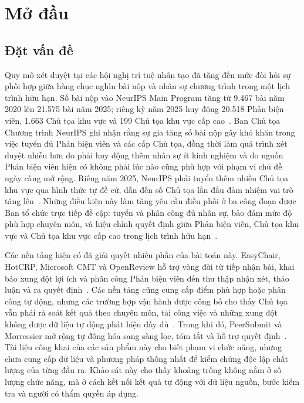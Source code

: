 \chapter{Mở đầu}
\label{Chapter1}

\section{Đặt vấn đề}

Quy mô xét duyệt tại các hội nghị trí tuệ nhân tạo đã tăng đến mức đòi hỏi sự phối hợp giữa hàng chục nghìn bài nộp và nhân sự chương trình trong một lịch trình hữu hạn. Số bài nộp vào NeurIPS Main Program tăng từ 9.467 bài năm 2020 lên 21.575 bài năm 2025; riêng kỳ năm 2025 huy động 20.518 Phản biện viên, 1.663 Chủ tọa khu vực và 199 Chủ tọa khu vực cấp cao~\cite{ch1ref17}. Ban Chủ tọa Chương trình NeurIPS ghi nhận rằng sự gia tăng số bài nộp gây khó khăn trong việc tuyển đủ Phản biện viên và các cấp Chủ tọa, đồng thời làm quá trình xét duyệt nhiễu hơn do phải huy động thêm nhân sự ít kinh nghiệm và do nguồn Phản biện viên hiện có không phải lúc nào cũng phù hợp với phạm vi chủ đề ngày càng mở rộng. Riêng năm 2025, NeurIPS phải tuyển thêm nhiều Chủ tọa khu vực qua hình thức tự đề cử, dẫn đến số Chủ tọa lần đầu đảm nhiệm vai trò tăng lên~\cite{ch1ref17}. Những điều kiện này làm tăng yêu cầu điều phối ở ba công đoạn được Ban tổ chức trực tiếp đề cập: tuyển và phân công đủ nhân sự, bảo đảm mức độ phù hợp chuyên môn, và hiệu chỉnh quyết định giữa Phản biện viên, Chủ tọa khu vực và Chủ tọa khu vực cấp cao trong lịch trình hữu hạn~\cite{ch1ref17}.

Các nền tảng hiện có đã giải quyết nhiều phần của bài toán này. EasyChair, HotCRP, Microsoft CMT và OpenReview hỗ trợ vòng đời từ tiếp nhận bài, khai báo xung đột lợi ích và phân công Phản biện viên đến thu thập nhận xét, thảo luận và ra quyết định~\cite{ch1ref5,ch1ref6,ch1ref7,ch1ref8}. Các nền tảng cũng cung cấp điểm phù hợp hoặc phân công tự động, nhưng các trường hợp vận hành được công bố cho thấy Chủ tọa vẫn phải rà soát kết quả theo chuyên môn, tải công việc và những xung đột không được dữ liệu tự động phát hiện đầy đủ~\cite{ch2ref4,ch2ref8}. Trong khi đó, PeerSubmit và Morressier mở rộng tự động hóa sang sàng lọc, tóm tắt và hỗ trợ quyết định~\cite{ch2ref47,ch2ref48}. Tài liệu công khai của các sản phẩm này cho biết phạm vi chức năng, nhưng chưa cung cấp dữ liệu và phương pháp thống nhất để kiểm chứng độc lập chất lượng của từng đầu ra. Khảo sát này cho thấy khoảng trống không nằm ở số lượng chức năng, mà ở cách kết nối kết quả tự động với dữ liệu nguồn, bước kiểm tra và người có thẩm quyền áp dụng.

